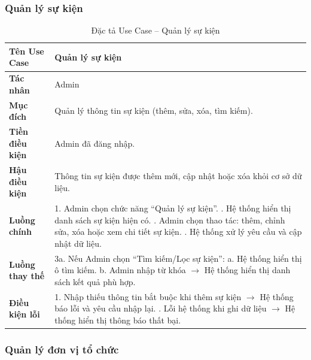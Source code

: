 \subsubsection{Quản lý sự kiện}
\begin{table}[H]
\centering
\renewcommand{\arraystretch}{1.3}
\setlength{\tabcolsep}{8pt}
\begin{tabularx}{\textwidth}{|l|X|}
\hline
\textbf{Tên Use Case} & Quản lý sự kiện \\ \hline
\textbf{Tác nhân} & Admin \\ \hline
\textbf{Mục đích} & Quản lý thông tin sự kiện (thêm, sửa, xóa, tìm kiếm). \\ \hline
\textbf{Tiền điều kiện} & Admin đã đăng nhập. \\ \hline
\textbf{Hậu điều kiện} & Thông tin sự kiện được thêm mới, cập nhật hoặc xóa khỏi cơ sở dữ liệu. \\ \hline
\textbf{Luồng chính} &
1. Admin chọn chức năng “Quản lý sự kiện”. \newline
2. Hệ thống hiển thị danh sách sự kiện hiện có. \newline
3. Admin chọn thao tác: thêm, chỉnh sửa, xóa hoặc xem chi tiết sự kiện. \newline
4. Hệ thống xử lý yêu cầu và cập nhật dữ liệu. \\ \hline
\textbf{Luồng thay thế} &
3a. Nếu Admin chọn “Tìm kiếm/Lọc sự kiện”: \newline
\hspace*{1em}a. Hệ thống hiển thị ô tìm kiếm. \newline
\hspace*{1em}b. Admin nhập từ khóa $\rightarrow$ Hệ thống hiển thị danh sách kết quả phù hợp. \\ \hline
\textbf{Điều kiện lỗi} &
1. Nhập thiếu thông tin bắt buộc khi thêm sự kiện $\rightarrow$ Hệ thống báo lỗi và yêu cầu nhập lại. \newline
2. Lỗi hệ thống khi ghi dữ liệu $\rightarrow$ Hệ thống hiển thị thông báo thất bại. \\ \hline
\end{tabularx}
\vspace{15pt}
\caption{Đặc tả Use Case -- Quản lý sự kiện}
\label{tab:uc_manage_event}
\end{table}

\subsubsection{Quản lý đơn vị tổ chức}


